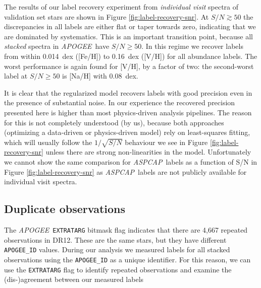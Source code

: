 \documentclass[12pt,preprint]{aastex}
\newcommand{\project}[1]{\textsl{#1}}
\newcommand{\acronym}[1]{{\small{#1}}}
\newcommand{\apogee}{\project{\acronym{APOGEE}}}
\newcommand{\aspcap}{\project{\acronym{ASPCAP}}}
\newcommand{\dr}{\acronym{DR12}}
\begin{document}
The results of our label recovery experiment from \emph{individual visit} spectra of
validation set stars are shown in Figure \ref{fig:label-recovery-snr}.  
At $S/N \gtrsim 50$ the discrepancies in all
labels are either flat or taper towards zero, indicating that we are dominated
by systematics.  This is an important transition point, because all 
\emph{stacked} spectra in \apogee\ have $S/N \geq 50$.  In this regime we 
recover labels from within 0.014~dex ([Fe/H]) to 0.16~dex ([V/H]) for all 
abundance labels.  The worst performance is again found for [V/H], by a factor of
two: the second-worst label at $S/N \geq 50$ is [Na/H] with 0.08~dex. 


It is clear that the regularized model recovers labels with good precision even
in the presence of substantial noise.  In our experience the recovered 
precision presented here is higher than most physics-driven analysis pipelines.  
The reason for this is not completely understood (by us), because both approaches 
(optimizing a data-driven or physics-driven model) rely on least-squares 
fitting, which will usually follow the $1/\sqrt{S/N}$ behaviour we see in Figure 
\ref{fig:label-recovery-snr} unless there are strong non-linearities in the model.
Unfortunately we cannot show the same comparison for \aspcap\ labels as a 
function of S/N in Figure \ref{fig:label-recovery-snr} as \aspcap\ labels are not
publicly available for individual visit spectra.


\subsection{Duplicate observations}
\label{sec:duplicate-observations}


The \apogee\ \texttt{EXTRATARG} bitmask flag indicates that there are 4,667
repeated observations in \dr.  These are the same stars, but they have different
\texttt{APOGEE\_ID} values.  During our analysis we measured labels for all
stacked observations using the \texttt{APOGEE\_ID} as a unique identifier.  For
this reason, we can use the \texttt{EXTRATARG} flag to identify repeated
observations and examine the (dis-)agreement between our measured labels



\end{document}
